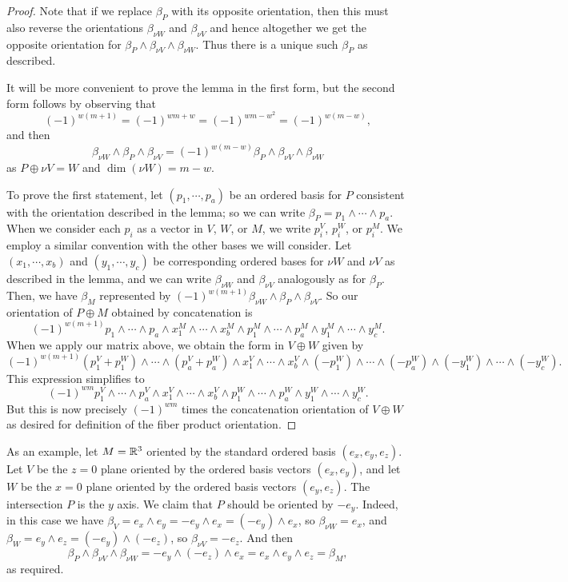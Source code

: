 \begin{proof}
	Note that if we replace $\beta_P$ with its opposite orientation, then this must also reverse the orientations $\beta_{\nu W}$ and $\beta_{\nu V}$ and hence altogether we get the opposite orientation for $\beta_P \wedge \beta_{\nu V} \wedge \beta_{\nu W}$.
	Thus there is a unique such $\beta_P$ as described.

	It will be more convenient to prove the lemma in the first form, but the second form follows by observing that $$(-1)^{w(m+1)} = (-1)^{wm+w} = (-1)^{wm-w^2} = (-1)^{w(m-w)},$$
	and then
	$$\beta_{\nu W} \wedge \beta_P \wedge \beta_{\nu V} = (-1)^{w(m-w)} \beta_P \wedge \beta_{\nu V} \wedge \beta_{\nu W}$$
	as $P \oplus \nu V = W$ and $\dim(\nu W) = m-w$.

	To prove the first statement, let $(p_1,\cdots,p_a)$ be an ordered basis for $P$ consistent with the orientation described in the lemma; so we can write $\beta_P = p_1 \wedge\cdots\wedge p_a$.
	When we consider each $p_i$ as a vector in $V$, $W$, or $M$, we write $p_i^V$, $p_i^W$, or $p_i^M$.
	We employ a similar convention with the other bases we will consider.
	Let $(x_1,\cdots,x_b)$ and $(y_1,\cdots,y_c)$ be corresponding ordered bases for $\nu W$ and $\nu V$ as described in the lemma, and we can write $\beta_{\nu W}$ and $\beta_{\nu V}$ analogously as for $\beta_P$.
	Then, we have $\beta_M$ represented by $(-1)^{w(m+1)} \beta_{\nu W} \wedge \beta_P \wedge \beta_{\nu V}.$ So our orientation of $P \oplus M$ obtained by concatenation is
	$$(-1)^{w(m+1)} p_1 \wedge\cdots\wedge p_a \wedge x^M_1 \wedge\cdots\wedge x^M_b \wedge p^M_1 \wedge\cdots\wedge p^M_a \wedge y^M_1 \wedge\cdots\wedge y^M_c.$$
	When we apply our matrix above, we obtain the form in $V \oplus W$ given by
	$$(-1)^{w(m+1)} (p^V_1+p^W_1) \wedge\cdots\wedge (p^V_a+p^W_a) \wedge x^V_1 \wedge\cdots\wedge x^V_b \wedge (- p^W_1) \wedge\cdots\wedge (-p^W_a) \wedge (-y^W_1) \wedge\cdots\wedge(- y^W_c).$$
	This expression simplifies to
	$$(-1)^{wm} p^V_1 \wedge\cdots\wedge p^V_a \wedge x^V_1 \wedge\cdots\wedge x^V_b \wedge p^W_1 \wedge\cdots\wedge p^W_a \wedge y^W_1 \wedge\cdots\wedge y^W_c.$$
	But this is now precisely $(-1)^{wm}$ times the concatenation orientation of $V \oplus W$ as desired for definition of the fiber product orientation.
\end{proof}

\begin{example}
	As an example, let $M = \mathbb{R}^3$ oriented by the standard ordered basis $(e_x,e_y,e_z)$.
	Let $V$ be the $z = 0$ plane oriented by the ordered basis vectors $(e_x,e_y)$, and let $W$ be the $x = 0$ plane oriented by the ordered basis vectors $(e_y,e_z)$.
	The intersection $P$ is the $y$ axis.
	We claim that $P$ should be oriented by $-e_y$.
	Indeed, in this case we have $\beta_V = e_x \wedge e_y = -e_y \wedge e_x = (-e_y) \wedge e_x$, so $\beta_{\nu W} = e_x$, and $\beta_W = e_y \wedge e_z = (-e_y) \wedge (-e_z)$, so $\beta_{\nu V} = -e_z$.
	And then $$\beta_P \wedge \beta_{\nu V} \wedge \beta_{\nu W} = -e_y \wedge (-e_z) \wedge e_x = e_x \wedge e_y \wedge e_z = \beta_M,$$
	as required.
\end{example}

